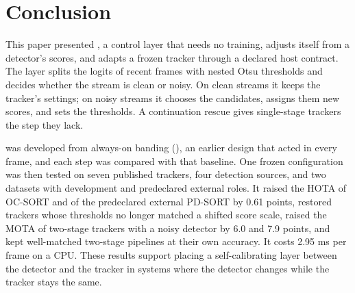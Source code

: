 \section{Conclusion}\label{sec:conclusion}

This paper presented \scl{}, a control layer that needs no training, adjusts
itself from a detector's scores, and adapts a frozen tracker through a
declared host contract. The layer splits the logits of recent frames with
nested Otsu thresholds and decides whether the stream is clean or noisy. On
clean streams it keeps the tracker's settings; on noisy streams it chooses
the candidates, assigns them new scores, and sets the thresholds. A
continuation rescue gives single-stage trackers the step they lack.

\scl{} was developed from always-on banding (\aob{}), an earlier design that
acted in every frame, and each step was compared with that baseline. One
frozen configuration was then tested on seven published trackers, four
detection sources, and two datasets with development and predeclared
external roles. It raised the HOTA of OC-SORT and of the predeclared
external PD-SORT by 0.61 points, restored trackers whose thresholds no longer
matched a shifted score scale, raised the MOTA of two-stage trackers with a
noisy detector by 6.0 and 7.9 points, and kept well-matched two-stage
pipelines at their own accuracy. It costs 2.95 ms per frame on a CPU. These
results support placing a self-calibrating layer between the detector and
the tracker in systems where the detector changes while the tracker stays
the same.
